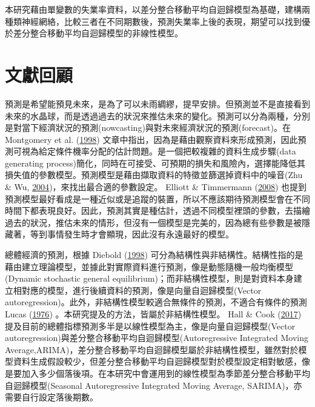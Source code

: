 \documentclass[oneside]{book}
\begin{document}
本研究藉由單變數的失業率資料，以差分整合移動平均自迴歸模型為基礎，建構兩種類神經網絡，比較三者在不同期數後，預測失業率上後的表現，期望可以找到優於差分整合移動平均自迴歸模型的非線性模型。

\hypertarget{ux6587ux737bux56deux9867}{%
\chapter{文獻回顧}\label{ux6587ux737bux56deux9867}}

預測是希望能預見未來，是為了可以未雨綢繆，提早安排。但預測並不是直接看到未來的水晶球，而是透過過去的狀況來推估未來的變化。預測可以分為兩種，分別是對當下經濟狀況的預測(nowcasting)與對未來經濟狀況的預測(forecast)。在 Montgomery et al. (\protect\hyperlink{ref-montgomeryForecastingUnemploymentRate1998}{1998}) 文章中指出，因為是藉由觀察資料來形成預測，因此預測可視為給定條件機率分配的估計問題。是一個把較複雜的資料生成步驟(data generating process)簡化，同時在可接受、可預期的損失和風險內，選擇能降低其損失值的參數模型。預測模型是藉由擷取資料的特徵並篩選掉資料中的噪音(Zhu \& Wu, \protect\hyperlink{ref-zhuClassNoiseVs2004}{2004})，來找出最合適的參數設定。 Elliott \& Timmermann (\protect\hyperlink{ref-elliottEconomicForecasting2008}{2008}) 也提到預測模型最好看成是一種近似或是追蹤的裝置，所以不應該期待預測模型會在不同時間下都表現良好。因此，預測其實是種估計，透過不同模型裡頭的參數，去描繪過去的狀況，推估未來的情形，但沒有一個模型是完美的，因為總有些參數是被隱藏著，等到事情發生時才會顯現，因此沒有永遠最好的模型。

總體經濟的預測，根據 Diebold (\protect\hyperlink{ref-dieboldPresentFutureMacroeconomic1998}{1998}) 可分為結構性與非結構性。結構性指的是藉由建立理論模型，並據此對實際資料進行預測，像是動態隨機一般均衡模型(Dynamic stochastic general equilibrium)；而非結構性模型，則是對資料本身建立相對應的模型，進行後續資料的預測，像是向量自迴歸模型(Vector autoregression)。此外，非結構性模型較適合無條件的預測，不適合有條件的預測 Lucas (\protect\hyperlink{ref-lucasEconometricPolicyEvaluation1976}{1976}) 。本研究提及的方法，皆屬於非結構性模型。 Hall \& Cook (\protect\hyperlink{ref-hallMacroeconomicIndicatorForecasting2017}{2017}) 提及目前的總體指標預測多半是以線性模型為主，像是向量自迴歸模型(Vector autoregression)與差分整合移動平均自迴歸模型(Autoregressive Integrated Moving Average,ARIMA)，差分整合移動平均自迴歸模型屬於非結構性模型，雖然對於模型資料生成假設較少，但差分整合移動平均自迴歸模型對於模型設定相對敏感，像是要加入多少個落後項。在本研究中會運用到的線性模型為季節差分整合移動平均自迴歸模型(Seasonal Autoregressive Integrated Moving Average, SARIMA)，亦需要自行設定落後期數。
\end{document}
